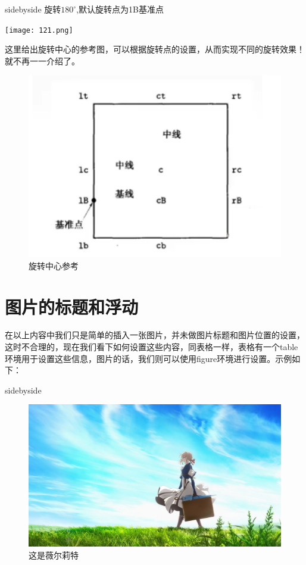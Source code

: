 \documentclass[cn,chinese,color=cyan]{elegantbook}
\begin{document}
\begin{tcblisting}{sidebyside}
旋转$180^\circ$,默认旋转点为1B基准点

\texttt{[image: 121.png]}
\end{tcblisting}
这里给出旋转中心的参考图，可以根据旋转点的设置，从而实现不同的旋转效果！就不再一一介绍了。
\begin{figure}[H]
	\centering
	\includegraphics[width=0.8\linewidth]{figure/xzd}
	\caption{旋转中心参考}
\end{figure}

\section{图片的标题和浮动}
在以上内容中我们只是简单的插入一张图片，并未做图片标题和图片位置的设置，这时不合理的，现在我们看下如何设置这些内容，同表格一样，表格有一个table环境用于设置这些信息，图片的话，我们则可以使用figure环境进行设置。示例如下：
\begin{tcblisting}{sidebyside}
\begin{figure}[H]
\centering
\includegraphics[width=0.8\linewidth]
{figure/welt}
\caption{这是薇尔莉特}
\end{figure}
\end{tcblisting}
\end{document}
